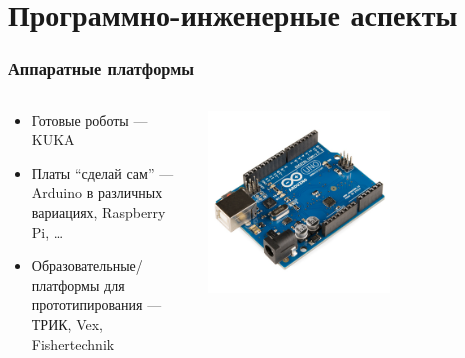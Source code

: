 \documentclass{../../slides-style}
\begin{document}
    \section{Программно-инженерные аспекты}

    \begin{frame}
        \frametitle{Аппаратные платформы}
        \begin{columns}
            \begin{column}{0.55\textwidth}
                \begin{itemize}
                    \item Готовые роботы --- KUKA
                    \item Платы \enquote{сделай сам} --- Arduino в различных вариациях, Raspberry Pi, \dots
                    \item Образовательные/платформы для прототипирования --- ТРИК, Vex, Fishertechnik
                \end{itemize}
            \end{column}
            \begin{column}{0.45\textwidth}
                \begin{center}
                    \includegraphics[width=0.6\textwidth]{arduinoUno.png}
                \end{center}
            \end{column}
        \end{columns}
    \end{frame}
\end{document}
